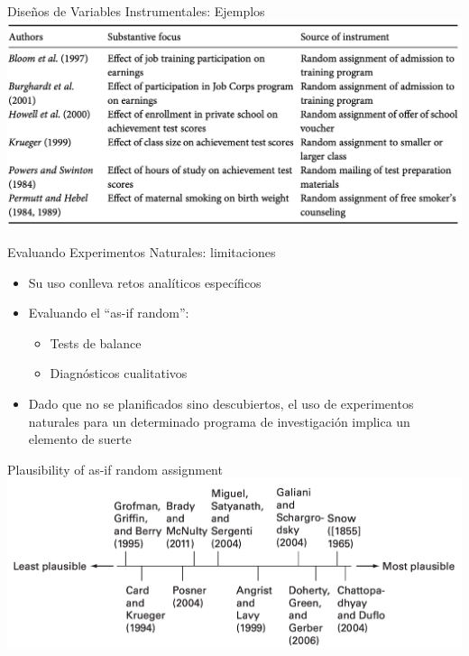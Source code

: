 \documentclass[
  ignorenonframetext,
]{beamer}
\providecommand{\tightlist}{%
  \setlength{\itemsep}{0pt}\setlength{\parskip}{0pt}}
\begin{document}
\begin{frame}{Diseños de Variables Instrumentales: Ejemplos}
\protect\hypertarget{diseuxf1os-de-variables-instrumentales-ejemplos}{}
\includegraphics{figs/nat_exp_IV2.png}
\end{frame}

\begin{frame}{Evaluando Experimentos Naturales: limitaciones}
\protect\hypertarget{evaluando-experimentos-naturales-limitaciones}{}
\begin{itemize}
\item
  Su uso conlleva retos analíticos específicos
\item
  Evaluando el ``as-if random'':

  \begin{itemize}
  \tightlist
  \item
    Tests de balance
  \item
    Diagnósticos cualitativos
  \end{itemize}
\item
  Dado que no se planificados sino descubiertos, el uso de experimentos
  naturales para un determinado programa de investigación implica un
  elemento de suerte
\end{itemize}
\end{frame}

\begin{frame}{Plausibility of as-if random assignment}
\protect\hypertarget{plausibility-of-as-if-random-assignment}{}
\includegraphics{figs/plausibility.png}
\end{frame}
\end{document}

